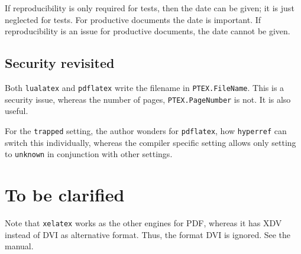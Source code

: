 \documentclass[a4paper, english]{article}%
\newcommand{\pdflatex}{\texttt{pdflatex}}
\newcommand{\lualatex}{\texttt{lualatex}}
\newcommand{\xelatex}{\texttt{xelatex}}
\begin{document}
If reproducibility is only required for tests, 
then the date can be given; it is just neglected for tests. 
For productive documents the date is important. 
If reproducibility is an issue for productive documents, the date cannot be given. 

\subsection{Security revisited}\label{subsec:security2}

Both \lualatex{} and \pdflatex{} write the filename in \texttt{PTEX.FileName}. 
This is a security issue, 
whereas the number of pages, \texttt{PTEX.PageNumber} is not. 
It is also useful. 

For the \texttt{trapped} setting, the author wonders for \pdflatex, 
how \texttt{hyperref} can switch this individually, whereas the compiler specific setting 
allows only setting to \texttt{unknown} 
in conjunction with other settings. 


\section{To be clarified}\label{sec:TBC}

Note that \xelatex{} works as the other engines for PDF, 
whereas it has XDV instead of DVI as alternative format. 
Thus, the format DVI is ignored. 
See the manual. 



{}%
\end{document}
